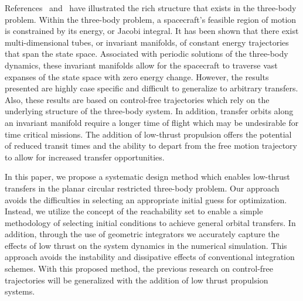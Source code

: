 \documentclass[preprint]{elsarticle}
\begin{document}
References~ and~ have illustrated the rich structure that exists in the three-body problem.
Within the three-body problem, a spacecraft's feasible region of motion is constrained by its energy, or Jacobi integral. 
It has been shown that there exist multi-dimensional tubes, or invariant manifolds, of constant energy trajectories that span the state space. 
Associated with periodic solutions of the three-body dynamics, these invariant manifolds allow for the spacecraft to traverse vast expanses of the state space with zero energy change. 
However, the results presented are highly case specific and difficult to generalize to arbitrary transfers.
Also, these results are based on control-free trajectories which rely on the underlying structure of the three-body system.
In addition, transfer orbits along an invariant manifold require a longer time of flight which may be undesirable for time critical missions.
The addition of low-thrust propulsion offers the potential of reduced transit times and the ability to depart from the free motion trajectory to allow for increased transfer opportunities. 

In this paper, we propose a systematic design method which enables low-thrust transfers in the planar circular restricted three-body problem.
Our approach avoids the difficulties in selecting an appropriate initial guess for optimization.
Instead, we utilize the concept of the reachability set to enable a simple methodology of selecting initial conditions to achieve general orbital transfers. 
In addition, through the use of geometric integrators we accurately capture the effects of low thrust on the system dynamics in the numerical simulation. 
This approach avoids the instability and dissipative effects of conventional integration schemes.
With this proposed method, the previous research on control-free trajectories will be generalized with the addition of low thrust propulsion systems.

\end{document}
